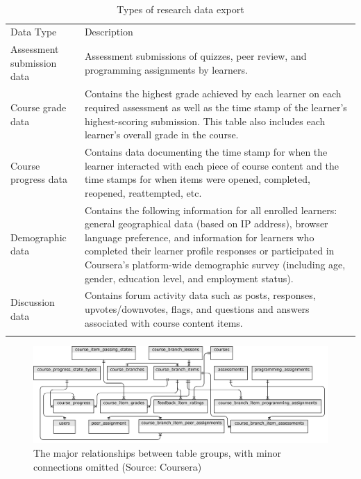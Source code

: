 \begin{table}
\footnotesize
\caption{Types of research data export}\
\centering
\label{tab:datatypes}
\begin{tabular}{p{4cm}|p{7cm}}
Data Type & Description \\
\addlinespace
\toprule
Assessment submission data & Assessment submissions of quizzes, peer review, and programming assignments by learners.\\
\midrule
Course grade data & Contains the highest grade achieved by each learner on each required assessment as well as the time stamp of the learner's highest-scoring submission. This table also includes each learner's overall grade in the course.\\
\midrule
Course progress data & Contains data documenting the time stamp for when the learner interacted with each piece of course content and the time stamps for when items were opened, completed, reopened, reattempted, etc.\\
\midrule
Demographic data & Contains the following information for all enrolled learners: general geographical data (based on IP address), browser language preference, and information for learners who completed their learner profile responses or participated in Coursera's platform-wide demographic survey (including age, gender, education level, and employment status).\\
\midrule
Discussion data & Contains forum activity data such as posts, responses, upvotes/downvotes, flags, and questions and answers associated with course content items.\\
\addlinespace
\bottomrule
\end{tabular}
\end{table}

\begin{figure}[htbp]
    \centering
    \includegraphics[width=\textwidth]{datatables}
    \caption{The major relationships between table groups, with minor connections omitted (Source: Coursera)}
    \label{figure:datatables}
\end{figure}


